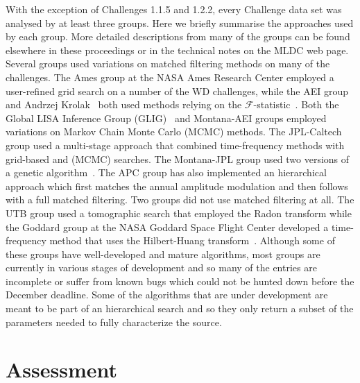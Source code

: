 \documentclass[12pt]{iopart}
\begin{document}
With the exception of Challenges 1.1.5 and 1.2.2, every Challenge data set was analysed by at least three groups. Here we briefly summarise the approaches used by each group. More detailed descriptions from many of the groups can be found elsewhere in these proceedings or in the technical notes on the MLDC web page. Several groups used variations on matched filtering methods on many of the challenges. The Ames group at the NASA Ames Research Center employed a user-refined grid search on a number of the WD challenges, while the AEI group and Andrzej Krolak~\cite{krolak04} both used methods relying on the $\mathcal{F}$-statistic~\cite{jaranowski98}. Both the Global LISA Inference Group (GLIG)~\cite{stroeer06,umstatter05,wickham06} and Montana-AEI groups employed variations on Markov Chain Monte Carlo (MCMC) methods. The JPL-Caltech group used a multi-stage approach that combined time-frequency methods with grid-based and (MCMC) searches. The Montana-JPL group used two versions of a genetic algorithm~\cite{crowder06a,crowder06b}. The APC group has also implemented an hierarchical approach which first matches the annual amplitude modulation and then follows with a full matched filtering. Two groups did not use matched filtering at all. The UTB group used a tomographic search that employed the Radon transform while the Goddard group at the NASA Goddard Space Flight Center developed a time-frequency method that uses the Hilbert-Huang transform~\cite{huang98}. Although some of these groups have well-developed and mature algorithms, most groups are currently in various stages of development and so many of the entries are incomplete or suffer from known bugs which could not be hunted down before the December deadline. Some of the algorithms that are under development are meant to be part of an hierarchical search and so they only return a subset of the parameters needed to fully characterize the source.

\section{Assessment}
\end{document}
